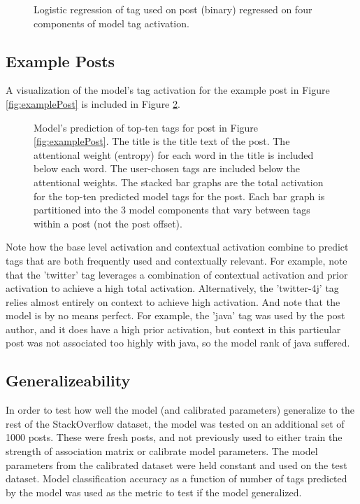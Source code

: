 \documentclass[10pt,letterpaper]{article}
\begin{document}
\begin{figure}[ht]
  \centering
  \caption{
    Logistic regression of tag used on post (binary) regressed on four components of model tag activation.
  }
  \label{fig:logReg}
\end{figure}

\subsection{Example Posts}

A visualization of the model's tag activation for the example post in Figure \ref{fig:examplePost} is included in Figure \ref{fig:modelPost}.

\begin{figure}[ht]
  \centering
  \caption{
    Model's prediction of top-ten tags for post in Figure \ref{fig:examplePost}.
    The title is the title text of the post.
    The attentional weight (entropy) for each word in the title is included below each word.
    The user-chosen tags are included below the attentional weights.
    The stacked bar graphs are the total activation for the top-ten predicted model tags for the post.
    Each bar graph is partitioned into the 3 model components that vary between tags within a post (not the post offset).
}
  \label{fig:modelPost}
\end{figure}

Note how the base level activation and contextual activation combine to predict tags that are both frequently used and contextually relevant.
For example, note that the 'twitter' tag leverages a combination of contextual activation and prior activation to achieve a high total activation.
Alternatively, the 'twitter-4j' tag relies almost entirely on context to achieve high activation.
And note that the model is by no means perfect.
For example, the 'java' tag was used by the post author, and it does have a high prior activation, but context in this particular post was not associated too highly with java, so the model rank of java suffered.

\subsection{Generalizeability}

In order to test how well the model (and calibrated parameters) generalize to the rest of the StackOverflow dataset, the model was tested on an additional set of \num{1000} posts.
These were fresh posts, and not previously used to either train the strength of association matrix or calibrate model parameters.
The model parameters from the calibrated dataset were held constant and used on the test dataset.
Model classification accuracy as a function of number of tags predicted by the model was used as the metric to test if the model generalized.
\end{document}
